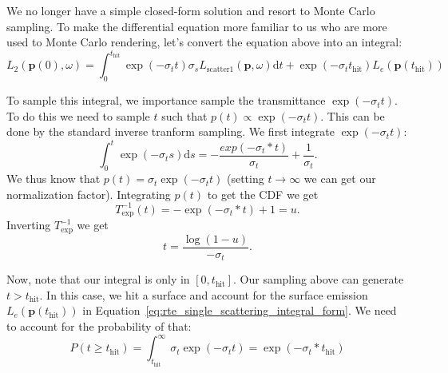 We no longer have a simple closed-form solution and resort to Monte Carlo sampling. To make the differential equation more familiar to us who are more used to Monte Carlo rendering, let's convert the equation above into an integral:
\begin{equation}
L_2(\mathbf{p}(0), \omega) = \int_{0}^{t_{\text{hit}}} \exp\left(-\sigma_t t \right) \sigma_s L_{\text{scatter}1}(\mathbf{p}, \omega) \mathrm{d}t + \exp\left(-\sigma_t t_{\text{hit}} \right) L_e(\mathbf{p}(t_{\text{hit}}))
\label{eq:rte_single_scattering_integral_form}
\end{equation}

To sample this integral, we importance sample the transmittance $\exp\left(-\sigma_t t\right)$. To do this we need to sample $t$ such that $p(t) \propto \exp\left(-\sigma_t t\right)$. This can be done by the standard inverse tranform sampling. We first integrate $\exp\left(-\sigma_t t \right)$:
\begin{equation}
\int_{0}^{t} \exp\left(-\sigma_t s\right) \mathrm{d}s = -\frac{exp(-\sigma_t * t)}{\sigma_t} + \frac{1}{\sigma_t}.
\end{equation}
We thus know that $p(t) = \sigma_t\exp\left(-\sigma_t t\right)$ (setting $t \rightarrow \infty$ we can get our normalization factor). Integrating $p(t)$ to get the CDF we get
\begin{equation}
T_{\text{exp}}^{-1}(t) = -\exp\left(-\sigma_t * t\right) + 1 = u.
\end{equation}
Inverting $T_{\text{exp}}^{-1}$ we get
\begin{equation}
t = \frac{\log\left(1 - u\right)}{-\sigma_t}.
\end{equation}

Now, note that our integral is only in $[0, t_{\text{hit}}]$. Our sampling above can generate $t > t_{\text{hit}}$. In this case, we hit a surface and account for the surface emission $L_e(\mathbf{p}(t_{\text{hit}}))$ in Equation~\ref{eq:rte_single_scattering_integral_form}. We need to account for the probability of that:
\begin{equation}
P(t \geq t_{\text{hit}}) = \int_{t_{\text{hit}}}^{\infty} \sigma_t\exp\left(-\sigma_t t\right) = \exp\left(-\sigma_t * t_{\text{hit}}\right)
\label{eq:hit_surface_prob}
\end{equation}

